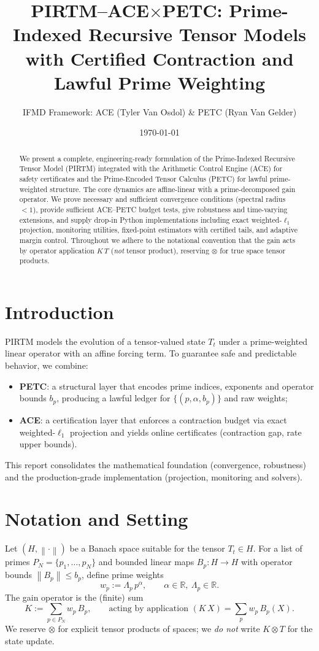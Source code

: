 \documentclass[11pt]{article}
\title{PIRTM--ACE$\times$PETC: \newline Prime-Indexed Recursive Tensor Models with \newline Certified Contraction and Lawful Prime Weighting}
\author{IFMD Framework: ACE (Tyler Van Osdol) \& PETC (Ryan Van Gelder)}
\date{\today}
\theoremstyle{definition}
\theoremstyle{remark}
\newcommand{\R}{\mathbb{R}}
\newcommand{\norm}[1]{\left\lVert #1\right\rVert}
\newcommand{\1}{\mathbf{1}}
\begin{document}
\begin{abstract}
We present a complete, engineering-ready formulation of the Prime-Indexed Recursive Tensor Model (PIRTM) integrated with the Arithmetic Control Engine (ACE) for safety certificates and the Prime-Encoded Tensor Calculus (PETC) for lawful prime-weighted structure. The core dynamics are affine-linear with a prime-decomposed gain operator. We prove necessary and sufficient convergence conditions (spectral radius $<1$), provide sufficient ACE--PETC budget tests, give robustness and time-varying extensions, and supply drop-in Python implementations including exact weighted-$\ell_1$ projection, monitoring utilities, fixed-point estimators with certified tails, and adaptive margin control. Throughout we adhere to the notational convention that the gain acts by operator application $K\,T$ (\emph{not} tensor product), reserving $\otimes$ for true space tensor products.
\end{abstract}

\tableofcontents

\section{Introduction}
PIRTM models the evolution of a tensor-valued state $T_t$ under a prime-weighted linear operator with an affine forcing term. To guarantee safe and predictable behavior, we combine:
\begin{itemize}[leftmargin=*]
  \item \textbf{PETC}: a structural layer that encodes prime indices, exponents and operator bounds $b_p$, producing a lawful ledger for $\{(p,\alpha,b_p)\}$ and raw weights;
  \item \textbf{ACE}: a certification layer that enforces a contraction budget via exact weighted-$\ell_1$ projection and yields online certificates (contraction gap, rate upper bounds).
\end{itemize}
This report consolidates the mathematical foundation (convergence, robustness) and the production-grade implementation (projection, monitoring and solvers).

\section{Notation and Setting}
Let $(H,\norm{\cdot})$ be a Banach space suitable for the tensor $T_t\in H$. For a list of primes $P_N=\{p_1,\dots,p_N\}$ and bounded linear maps $B_p:H\to H$ with operator bounds $\norm{B_p}\le b_p$, define prime weights
\[
  w_p := \Lambda_p\,p^{\alpha}, \qquad \alpha\in\R, \ \Lambda_p\in\R.
\]
The gain operator is the (finite) sum
\[
  K := \sum_{p\in P_N} w_p\,B_p, \qquad \text{acting by application } (K\,X)=\sum_{p} w_p\,B_p(X).
\]
We reserve $\otimes$ for explicit tensor products of spaces; we \emph{do not} write $K\otimes T$ for the state update.
\end{document}
